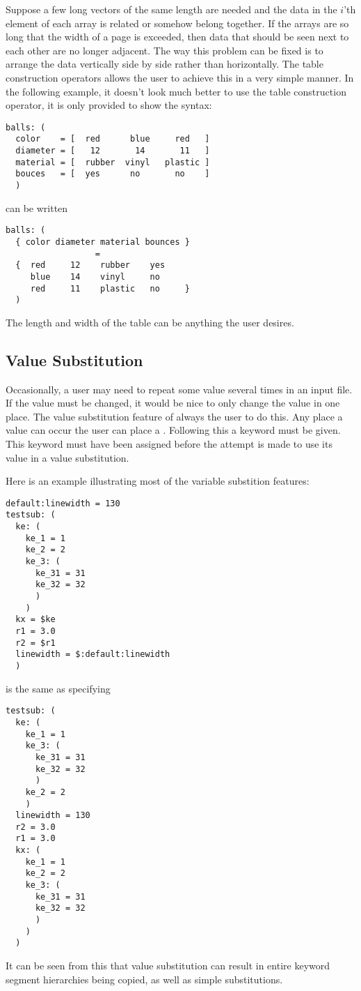 Suppose a few long vectors of the same length are needed and the data
in the $i$'th element of each array is related or somehow belong together.
If the arrays are so long that the width of a page is exceeded, then
data that should be seen next to each other are no longer adjacent.
The way this problem can be fixed is to arrange the data vertically
side by side rather than horizontally.  The table construction
operators allows the user to achieve this in a very simple manner.
In the following example, it doesn't look much better to use
the table construction operator, it is only provided to show the
syntax:
\begin{verbatim}
balls: (
  color    = [  red      blue     red   ]
  diameter = [   12       14       11   ]
  material = [  rubber  vinyl   plastic ]
  bouces   = [  yes      no       no    ]
  )
\end{verbatim}
can be written
\begin{verbatim}
balls: (
  { color diameter material bounces }
                  =
  {  red     12    rubber    yes
     blue    14    vinyl     no
     red     11    plastic   no     }
  )
\end{verbatim}
The length and width of the table can be anything the user desires.

\subsection{Value Substitution}
Occasionally, a user may need to repeat some value several times in
an input file.  If the value must be changed, it would be nice to
only change the value in one place.  The value substitution feature
of \libip{} always the user to do this.  Any place a value can
occur the user can place a \lit{\$}.  Following this a keyword
must be given.  This keyword must have been assigned before
the attempt is made to use its value in a value substitution.

Here is an example illustrating most of the variable substition
features:
\begin{verbatim}
default:linewidth = 130
testsub: (
  ke: (
    ke_1 = 1
    ke_2 = 2
    ke_3: (
      ke_31 = 31
      ke_32 = 32
      )
    )
  kx = $ke
  r1 = 3.0
  r2 = $r1
  linewidth = $:default:linewidth
  )
\end{verbatim}
is the same as specifying
\begin{verbatim}
testsub: (
  ke: (
    ke_1 = 1
    ke_3: (
      ke_31 = 31
      ke_32 = 32
      )
    ke_2 = 2
    )
  linewidth = 130
  r2 = 3.0
  r1 = 3.0
  kx: (
    ke_1 = 1
    ke_2 = 2
    ke_3: (
      ke_31 = 31
      ke_32 = 32
      )
    )
  )
\end{verbatim}
It can be seen from this that value substitution can result in
entire keyword segment hierarchies being copied, as well as
simple substitutions.

